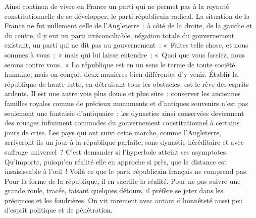 \documentclass[french,twoside]{book} %
\begin{document}
Ainsi continua de vivre en France un parti qui ne permet pas à la royauté constitutionnelle de se développer, le parti républicain radical. La situation de la France ne fut nullement celle de l’Angleterre ; à côté de la droite, de la gauche et du centre, il y eut un parti irréconciliable, négation totale du gouvernement existant, un parti qui ne dit pas au gouvernement : « Faites telle chose, et nous sommes à vous ; » mais qui lui laisse entendre : « Quoi que vous fassiez, nous serons contre vous. » La république est en un sens le terme de toute société humaine, mais on conçoit deux manières bien différentes d’y venir. Établir la république de haute lutte, en détruisant tous les obstacles, est le rêve des esprits ardents. Il est une autre voie plus douce et plus sûre : conserver les anciennes familles royales comme de précieux monuments et d’antiques souvenirs n’est pas seulement une fantaisie d’antiquaire ; les dynasties ainsi conservées deviennent des rouages infiniment commodes du gouvernement constitutionnel à certains jours de crise. Les pays qui ont suivi cette marche, comme l’Angleterre, arriveront-ils un jour à la république parfaite, sans dynastie héréditaire et avec suffrage universel ? C’est demander si l’hyperbole atteint ses asymptotes. Qu’importe, puisqu’en réalité elle en approche si près, que la distance est insaisissable à l’œil ! Voilà ce que le parti républicain français ne comprend pas. Pour la forme de la république, il en sacrifie la réalité. Pour ne pas suivre une grande roule, tracée, faisant quelques détours, il préfère se jeter dans les précipices et les fondrières. On vit rarement avec autant d’honnêteté aussi peu d’esprit politique et de pénétration.\par
\end{document}
